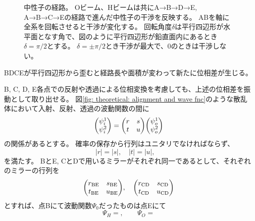 \documentclass[dvipdfmx]{jsarticle}
\begin{document}
\begin{figure}
    \centering
    \caption{
        中性子の経路。
        Oビーム、Hビームは共にA→B→D→E, A→B→C→Eの経路で進んだ中性子の干渉を反映する。
        ABを軸に全系を回転させると干渉が変化する。
        回転角度$\delta$は平行四辺形が水平面となす角で、図のように平行四辺形が鉛直面内にあるとき$\delta=\pi/2$とする。
        $\delta=\pm\pi/2$とき干渉が最大で、$0$のときは干渉しない。
    }
    \label{fig: theoretical: neutron paths and O/H beams}
\end{figure}

BDCEが平行四辺形から歪むと経路長や面積が変わって新たに位相差が生じる。




B, C, D, E各点での反射や透過による位相変換を考慮しても、上述の位相差を振動として取り出せる。
図\ref{fig: theoretical: alignment and wave fnc}のような散乱体において入射、反射、透過の波動関数の間に
\begin{equation*}
    \mqty(\psi_i^1\\\psi_i^2)
    =
    \mqty(r & s \\ t & u)
    \mqty(\psi_o^1\\\psi_o^2)
\end{equation*}
の関係があるとする。
確率の保存から行列はユニタリでなければならず、
\begin{equation*}
    |r|=|s|,
    \quad
    |t|=|u|,
    \quad
\end{equation*}
を満たす。
BとE, CとDで用いるミラーがそれぞれ同一であるとして、それぞれのミラーの行列を
\begin{equation*}
    \mqty(r_\mathrm{BE} & s_\mathrm{BE} \\ t_\mathrm{BE} & u_\mathrm{BE}),
    \quad
    \mqty(r_\mathrm{CD} & s_\mathrm{CD} \\ t_\mathrm{CD} & u_\mathrm{CD})
\end{equation*}
とすれば、点Bにて波動関数$\Psi_0$だったものは点Eにて
\begin{equation*}
    \Psi_H
    =
    ,\qquad
    \Psi_O
    =
\end{equation*}
\end{document}
